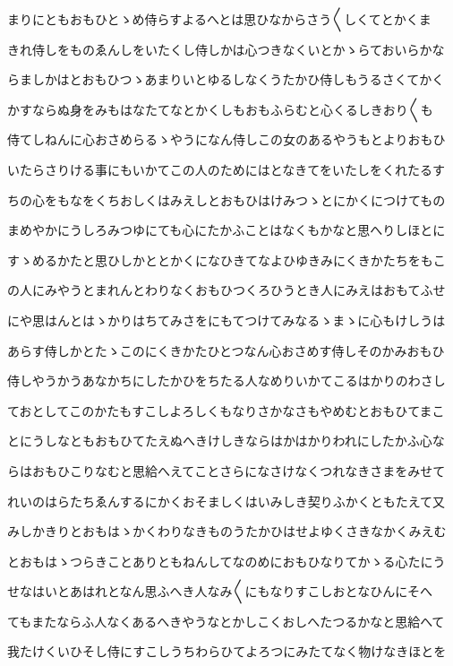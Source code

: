 \documentclass[a4paper,11pt,landscape]{ltjtarticle}
\begin{document}
まりにともおもひとゝめ侍らすよるへとは思ひなからさう〱しくてとかくま
\par\medskip
きれ侍しをものゑんしをいたくし侍しかは心つきなくいとかゝらておいらかな
\par\medskip
らましかはとおもひつゝあまりいとゆるしなくうたかひ侍しもうるさくてかく
\par\medskip
かすならぬ身をみもはなたてなとかくしもおもふらむと心くるしきおり〱も
\par\medskip
侍てしねんに心おさめらるゝやうになん侍しこの女のあるやうもとよりおもひ
\par\medskip
いたらさりける事にもいかてこの人のためにはとなきてをいたしをくれたるす
\par\medskip
ちの心をもなをくちおしくはみえしとおもひはけみつゝとにかくにつけてもの
\par\medskip
まめやかにうしろみつゆにても心にたかふことはなくもかなと思へりしほとに
\par\medskip
すゝめるかたと思ひしかととかくになひきてなよひゆきみにくきかたちをもこ
\par\medskip
の人にみやうとまれんとわりなくおもひつくろひうとき人にみえはおもてふせ
\par\medskip
にや思はんとはゝかりはちてみさをにもてつけてみなるゝまゝに心もけしうは
\par\medskip
あらす侍しかとたゝこのにくきかたひとつなん心おさめす侍しそのかみおもひ
\par\medskip
侍しやうかうあなかちにしたかひをちたる人なめりいかてこるはかりのわさし
\par\medskip
ておとしてこのかたもすこしよろしくもなりさかなさもやめむとおもひてまこ
\par\medskip
とにうしなともおもひてたえぬへきけしきならはかはかりわれにしたかふ心な
\par\medskip
らはおもひこりなむと思給へえてことさらになさけなくつれなきさまをみせて
\par\medskip
れいのはらたちゑんするにかくおそましくはいみしき契りふかくともたえて又
\par\medskip
みしかきりとおもはゝかくわりなきものうたかひはせよゆくさきなかくみえむ
\par\medskip
とおもはゝつらきことありともねんしてなのめにおもひなりてかゝる心たにう
\par\medskip
せなはいとあはれとなん思ふへき人なみ〱にもなりすこしおとなひんにそへ
\par\medskip
てもまたならふ人なくあるへきやうなとかしこくおしへたつるかなと思給へて
\par\medskip
我たけくいひそし侍にすこしうちわらひてよろつにみたてなく物けなきほとを
\end{document}
